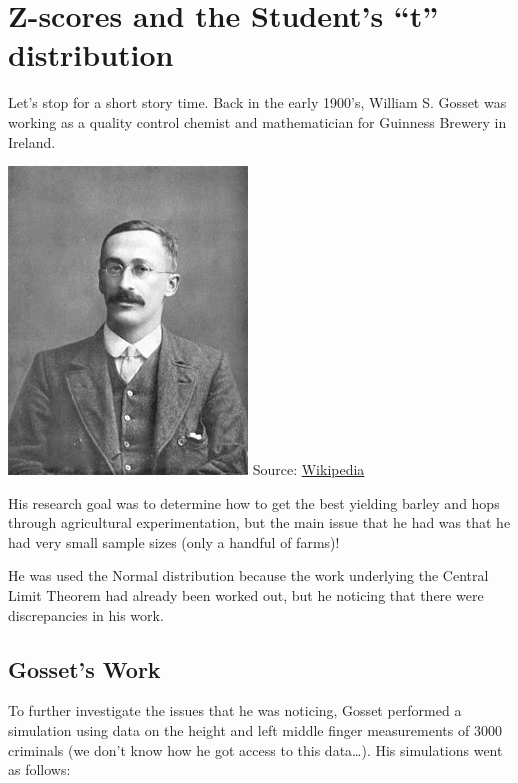 \documentclass[
]{book}
\begin{document}
\hypertarget{z-scores-and-the-students-t-distribution}{%
\section{Z-scores and the Student's ``t'' distribution}\label{z-scores-and-the-students-t-distribution}}

Let's stop for a short story time. Back in the early 1900's, William S. Gosset was working as a quality control chemist and mathematician for Guinness Brewery in Ireland.

\includegraphics{Photos/gosset.jpg}
Source: \href{http://upload.wikimedia.org/wikipedia/commons/thumb/4/42/William_Sealy_Gosset.jpg/240px-William_Sealy_Gosset.jpg}{Wikipedia}

His research goal was to determine how to get the best yielding barley and hops through agricultural experimentation, but the main issue that he had was that he had very small sample sizes (only a handful of farms)!

He was used the Normal distribution because the work underlying the Central Limit Theorem had already been worked out, but he noticing that there were discrepancies in his work.

\hypertarget{gossets-work}{%
\subsection{Gosset's Work}\label{gossets-work}}

To further investigate the issues that he was noticing, Gosset performed a simulation using data on the height and left middle finger measurements of 3000 criminals (we don't know how he got access to this data\ldots). His simulations went as follows:
\end{document}
